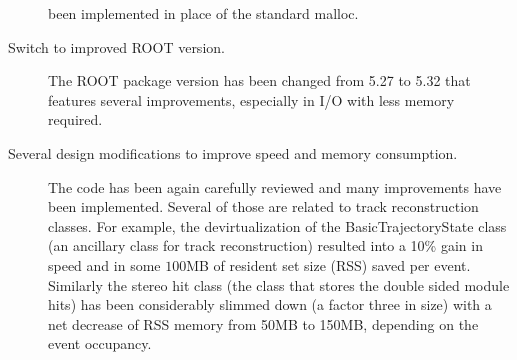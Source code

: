 \begin{description}
  been implemented in place of the standard malloc.
\item[Switch to improved ROOT version.] The ROOT package version has
  been changed from 5.27 to 5.32 that features several improvements,
  especially in I/O with less memory required. 
\item[Several design modifications to improve speed and memory
  consumption.] The code has been again carefully reviewed and many
  improvements have been implemented. Several of those are related to
  track reconstruction classes. For example, the devirtualization of
  the BasicTrajectoryState class (an ancillary class for track
  reconstruction) resulted into a 10\% gain in speed and in some
  $100$MB of resident set size (RSS) saved per event. Similarly the
  stereo hit class (the class that stores the double sided module hits) has been
  considerably slimmed down (a factor three in size) with a net decrease of
  RSS memory from 50MB to 150MB, depending on the event occupancy.
\end{description}

